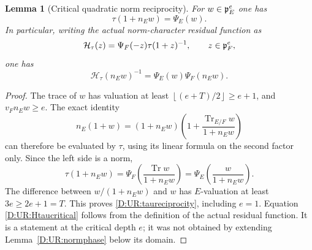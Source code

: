 \documentclass[11pt]{amsart}
\newtheorem{lemma}[theorem]{Lemma}
\theoremstyle{definition}
\theoremstyle{remark}
\newcommand{\Tr}{\operatorname{Tr}}
\newcommand{\floor}[1]{\left\lfloor #1\right\rfloor}
\begin{document}
\begin{lemma}[Critical quadratic norm reciprocity]\label{D:UR:resreciprocity}
For $w\in\mathfrak p_E^e$ one has
\begin{equation}\label{D:UR:taureciprocity}
 \tau(1+n_Ew)=\Psi_E(w).
\end{equation}
In particular, writing the actual norm-character residual function as
\[
 \mathcal H_\tau(z)=\Psi_F(-z)\tau(1+z)^{-1},\qquad z\in\mathfrak p_F^e,
\]
one has
\begin{equation}\label{D:UR:Htaucritical}
 \mathcal H_\tau(n_Ew)^{-1}=\Psi_E(w)\Psi_F(n_Ew).
\end{equation}
\end{lemma}
\begin{proof}
The trace of $w$ has valuation at least
$\floor{(e+T)/2}\ge e+1$, and $v_F n_Ew\ge e$.
The exact identity
\[
 n_E(1+w)=(1+n_Ew)
             \left(1+\frac{\Tr_{E/F}w}{1+n_Ew}\right)
\]
can therefore be evaluated by $\tau$, using its linear formula on the
second factor only. Since the left side is a norm,
\[
 \tau(1+n_Ew)
   =\Psi_F\!\left(\frac{\Tr w}{1+n_Ew}\right)
   =\Psi_E\!\left(\frac{w}{1+n_Ew}\right).
\]
The difference between $w/(1+n_Ew)$ and $w$ has $E$-valuation at least
$3e\ge2e+1=T$. This proves \eqref{D:UR:taureciprocity}, including $e=1$.
Equation \eqref{D:UR:Htaucritical} follows from the definition of the actual
residual function. It is a statement at the critical depth $e$;
it was not obtained by extending Lemma~\ref{D:UR:normphase} below its domain.
\end{proof}
\end{document}
